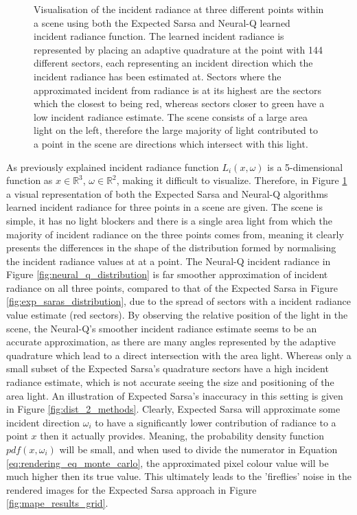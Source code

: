 \documentclass[../dissertation.tex]{subfiles}
\begin{document}
\begin{figure}[h]
  \label{fig:neural_q_distribution}
\endminipage
\caption{Visualisation of the incident radiance at three different points within a scene using both the Expected Sarsa and Neural-Q learned incident radiance function. The learned incident radiance is represented by placing an adaptive quadrature at the point with 144 different sectors, each representing an incident direction which the incident radiance has been estimated at. Sectors where the approximated incident from radiance is at its highest are the sectors which the closest to being red, whereas sectors closer to green have a low incident radiance estimate. The scene consists of a large area light on the left, therefore the large majority of light contributed to a point in the scene are directions which intersect with this light.}
\label{fig:distribution_visualisation}
\end{figure}

As previously explained incident radiance function $L_i(x, \omega)$ is a 5-dimensional function as $x \in \mathbb{R}^3$, $\omega \in \mathbb{R}^2$, making it difficult to visualize. Therefore, in Figure \ref{fig:distribution_visualisation} a visual representation of both the Expected Sarsa and Neural-Q algorithms learned incident radiance for three points in a scene are given. The scene is simple, it has no light blockers and there is a single area light from which the majority of incident radiance on the three points comes from, meaning it clearly presents the differences in the shape of the distribution formed by normalising the incident radiance values at at a point. The Neural-Q incident radiance in Figure \ref{fig:neural_q_distribution} is far smoother approximation of incident radiance on all three points, compared to that of the Expected Sarsa in Figure \ref{fig:exp_saras_distribution}, due to the spread of sectors with a incident radiance value estimate (red sectors). By observing the relative position of the light in the scene, the Neural-Q's smoother incident radiance estimate seems to be an accurate approximation, as there are many angles represented by the adaptive quadrature which lead to a direct intersection with the area light. Whereas only a small subset of the Expected Sarsa's quadrature sectors have a high incident radiance estimate, which is not accurate seeing the size and positioning of the area light. An illustration of Expected Sarsa's inaccuracy in this setting is given in Figure \ref{fig:dist_2_methods}. Clearly, Expected Sarsa will approximate some incident direction $\omega_i$ to have a significantly lower contribution of radiance to a point $x$ then it actually provides. Meaning, the probability density function $pdf(x, \omega_i)$ will be small, and when used to divide the numerator in Equation \ref{eq:rendering_eq_monte_carlo}, the approximated pixel colour value will be much higher then its true value. This ultimately leads to the 'fireflies' noise in the rendered images for the Expected Sarsa approach in Figure \ref{fig:mape_results_grid}.
\end{document}
